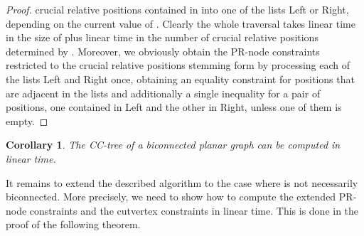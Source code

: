 \documentclass{scrartcl}
\newcommand{\1}[1]{{\normalfont \ensuremath{#1^{\tiny\circled{1}}}}} \newcommand{\2}[1]{{\normalfont \ensuremath{#1^{\tiny\circled{2}}}}} \renewcommand{\k}[1]{{\normalfont \ensuremath{#1^{\tiny\circled{k}}}}} \newcommand{\proj}[2]{\ensuremath{\left.#1\right|_{#2}}} \newcommand{\eps}{\varepsilon}
\theoremstyle{plain} \newtheorem{theorem}{Theorem} \newcounter{lemmacounter} \setcounter{lemmacounter}{0} \newtheorem{lemma}[lemmacounter]{Lemma} \newtheorem{fact}{Fact}  \newtheorem{corollary}{Corollary} \theoremstyle{definition} \newtheorem{definition}{Definition}
\begin{document}
\begin{proof}
  crucial relative positions  contained in 
  into one of the lists {\sc Left} or {\sc Right}, depending on the
  current value of .  Clearly the whole traversal takes
  linear time in the size of  plus linear time in the
  number of crucial relative positions determined by .  Moreover,
  we obviously obtain the PR-node constraints restricted to the
  crucial relative positions stemming form  by processing each of
  the lists {\sc Left} and {\sc Right} once, obtaining an equality
  constraint for positions that are adjacent in the lists and
  additionally a single inequality for a pair of positions, one
  contained in {\sc Left} and the other in {\sc Right}, unless one of
  them is empty.
\end{proof}

\begin{corollary}
  The CC-tree  of a biconnected planar graph  can be
  computed in linear time.
\end{corollary}

It remains to extend the described algorithm to the case where  is
not necessarily biconnected.  More precisely, we need to show how to
compute the extended PR-node constraints and the cutvertex constraints
in linear time.  This is done in the proof of the following theorem.
\end{document}
